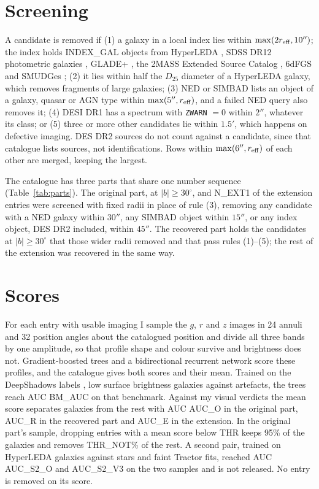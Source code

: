\documentclass{aastex701}
\begin{document}
\section{Screening}

A candidate is removed if (1) a galaxy in a local index lies within
$\max(2r_{\rm eff}, 10'')$; the index holds {{INDEX_GAL}} objects from HyperLEDA
\citep{makarov2014}, SDSS DR12 photometric galaxies \citep{alam2015}, GLADE+
\citep{dalya2022}, the 2MASS Extended Source Catalog \citep{jarrett2000}, 6dFGS
\citep{jones2009} and SMUDGes \citep{zaritsky2023}; (2) it lies within half the
$D_{25}$ diameter of a HyperLEDA galaxy, which removes fragments of large
galaxies; (3) NED or SIMBAD \citep{wenger2000} lists an object of a galaxy,
quasar or AGN type within $\max(5'', r_{\rm eff})$, and a failed NED query also
removes it; (4) DESI DR1 \citep{desidr1} has a spectrum with \texttt{ZWARN}
$= 0$ within $2''$, whatever its class; or (5) three or more other candidates lie
within $1.5'$, which happens on defective imaging. DES DR2 sources
\citep{abbott2021des} do not count against a candidate, since that catalogue
lists sources, not identifications. Rows within $\max(6'', r_{\rm eff})$ of each
other are merged, keeping the largest.

The catalogue has three parts that share one number sequence
(Table~\ref{tab:parts}). The original part, at $|b| \ge 30^\circ$, and
{{N_EXT1}} of the extension entries were screened with fixed radii in place of
rule (3), removing any candidate with a NED galaxy within $30''$, any SIMBAD
object within $15''$, or any index object, DES DR2 included, within $45''$.
The recovered part holds the candidates at $|b| \ge 30^\circ$ that those wider
radii removed and that pass rules (1)--(5); the rest of the extension was
recovered in the same way.

\section{Scores}

For each entry with usable imaging I sample the $g$, $r$ and $z$ images in 24
annuli and 32 position angles about the catalogued position and divide all three
bands by one amplitude, so that profile shape and colour survive and brightness
does not. Gradient-boosted trees and a bidirectional recurrent network score
these profiles, and the catalogue gives both scores and their mean. Trained on
the DeepShadows labels \citep{tanoglidis2021}, low surface brightness galaxies
against artefacts, the trees reach AUC {{BM_AUC}} on that benchmark. Against my
visual verdicts the mean score separates galaxies from the rest with AUC
{{AUC_O}} in the original part, {{AUC_R}} in the recovered part and {{AUC_E}} in
the extension. In the original part's sample, dropping entries with a mean score
below {{THR}} keeps 95\% of the galaxies and removes {{THR_NOT}}\% of the rest.
A second pair, trained on HyperLEDA galaxies against stars and
faint Tractor fits, reached AUC {{AUC_S2_O}} and {{AUC_S2_V3}} on the two samples
and is not released. No entry is removed on its score.
\end{document}
